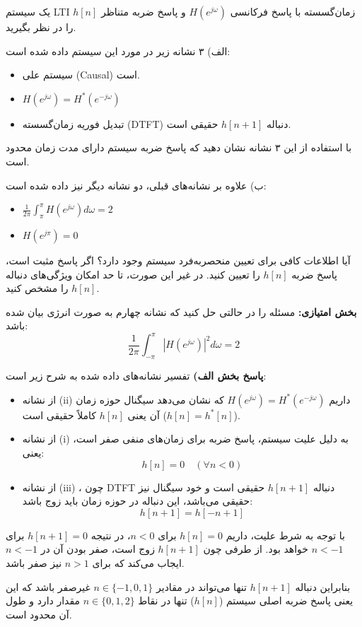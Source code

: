 یک سیستم LTI زمان‌گسسته با پاسخ فرکانسی $H(e^{j\omega})$ و پاسخ ضربه متناظر $h[n]$ را در نظر بگیرید.

الف) ۳ نشانه زیر در مورد این سیستم داده شده است:
\begin{itemize}
    \item سیستم علی (Causal) است.
    \item $H(e^{j\omega}) = H^*(e^{-j\omega})$
    \item تبدیل فوریه زمان‌گسسته (DTFT) دنباله $h[n+1]$ حقیقی است.
\end{itemize}
با استفاده از این ۳ نشانه نشان دهید که پاسخ ضربه سیستم دارای مدت زمان محدود است.

ب) علاوه بر نشانه‌های قبلی، دو نشانه دیگر نیز داده شده است:
\begin{itemize}
    \item $\frac{1}{2\pi} \int_{\pi}^{\pi} H(e^{j\omega}) d\omega = 2$
    \item $H(e^{j\pi}) = 0$
\end{itemize}
آیا اطلاعات کافی برای تعیین منحصربه‌فرد سیستم وجود دارد؟ اگر پاسخ مثبت است، پاسخ ضربه $h[n]$ را تعیین کنید. در غیر این صورت، تا حد امکان ویژگی‌های دنباله $h[n]$ را مشخص کنید.

\textbf{بخش امتیازی:} مسئله را در حالتی حل کنید که نشانه چهارم به صورت انرژی بیان شده باشد:
\[
\frac{1}{2\pi} \int_{-\pi}^{\pi} |H(e^{j\omega})|^2 d\omega = 2
\]



\textbf{پاسخ بخش الف)} 
تفسیر نشانه‌های داده شده به شرح زیر است:
\begin{itemize}
    \item از نشانه (ii) داریم $H(e^{j\omega}) = H^*(e^{-j\omega})$ که نشان می‌دهد سیگنال حوزه زمان آن یعنی $h[n]$ کاملاً حقیقی است ($h[n] = h^*[n]$).
    \item از نشانه (i) به دلیل علیت سیستم، پاسخ ضربه برای زمان‌های منفی صفر است، یعنی:
    \[ h[n] = 0 \quad (\forall n < 0) \]
    \item از نشانه (iii) ، چون DTFT دنباله $h[n+1]$ حقیقی است و خود سیگنال نیز حقیقی می‌باشد، این دنباله در حوزه زمان باید زوج باشد:
    \[ h[n+1] = h[-n+1] \]
\end{itemize}
با توجه به شرط علیت، داریم $h[n] = 0$ برای $n < 0$، در نتیجه $h[n+1] = 0$ برای $n < -1$ خواهد بود. از طرفی چون $h[n+1]$ زوج است، صفر بودن آن در $n < -1$ ایجاب می‌کند که برای $n > 1$ نیز صفر باشد. 

بنابراین دنباله $h[n+1]$ تنها می‌تواند در مقادیر $n \in \{-1, 0, 1\}$ غیرصفر باشد که این یعنی پاسخ ضربه اصلی سیستم ($h[n]$) تنها در نقاط $n \in \{0, 1, 2\}$ مقدار دارد و طول آن محدود است.

